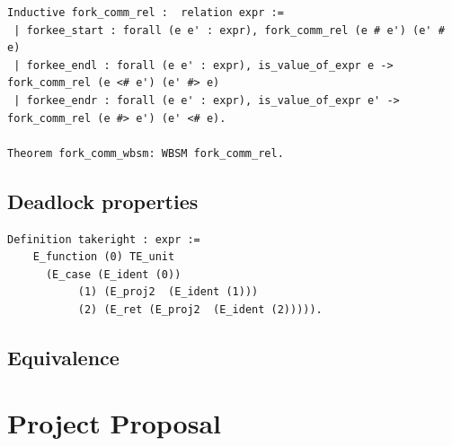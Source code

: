 \documentclass[12pt,twoside,notitlepage]{report}
\theoremstyle{plain}%
\theoremstyle{definition}
\theoremstyle{remark}
\begin{document}
\begin{minipage}{\linewidth}
\begin{lstlisting}[language={Coq}, caption={Fork commutativity}]
Inductive fork_comm_rel :  relation expr := 
 | forkee_start : forall (e e' : expr), fork_comm_rel (e # e') (e' # e)
 | forkee_endl : forall (e e' : expr), is_value_of_expr e -> fork_comm_rel (e <# e') (e' #> e)
 | forkee_endr : forall (e e' : expr), is_value_of_expr e' -> fork_comm_rel (e #> e') (e' <# e).
 
Theorem fork_comm_wbsm: WBSM fork_comm_rel.
\end{lstlisting}
\end{minipage}
\section{Deadlock properties}
\begin{minipage}{1\linewidth}
\begin{lstlisting}[language={Coq}, caption={The original Coq $\mathit{takeright}$ function}, label={lst:orig_coq_takeright}]
Definition takeright : expr :=
    E_function (0) TE_unit 
      (E_case (E_ident (0)) 
           (1) (E_proj2  (E_ident (1))) 
           (2) (E_ret (E_proj2  (E_ident (2))))).
\end{lstlisting}
\end{minipage}
\section{Equivalence}
\cleardoublepage

\chapter{Project Proposal}


\end{document}
